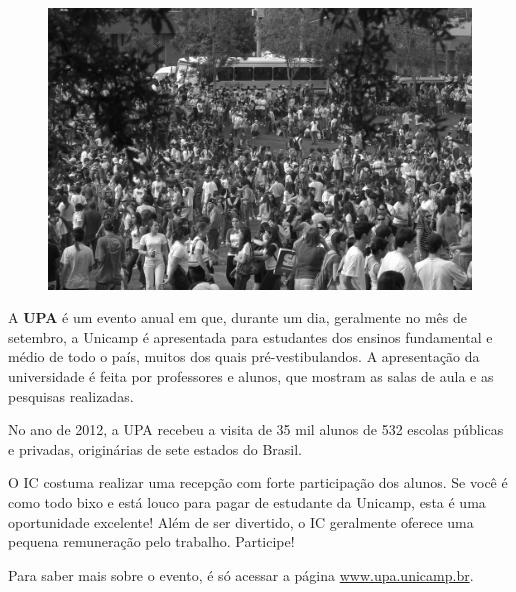 \begin{figure}[h!]
    \centering
    \includegraphics[scale=0.38, keepaspectratio=true]{img/imgs/bateria.jpg}
\end{figure}

A \textbf{UPA} é um evento anual em que, durante um dia, geralmente no mês
de setembro, a Unicamp é apresentada para estudantes dos ensinos fundamental
e médio de todo o país, muitos dos quais pré-vestibulandos. A apresentação
da universidade é feita por professores e alunos, que mostram as salas de aula
e as pesquisas realizadas.

No ano de 2012, a UPA recebeu a visita de 35 mil alunos de 532 escolas públicas
e privadas, originárias de sete estados do Brasil.

O IC costuma realizar uma recepção com forte participação dos alunos. Se você
é como todo bixo e está louco para pagar de estudante da Unicamp, esta é uma
oportunidade excelente! Além de ser divertido, o IC geralmente oferece uma
pequena remuneração pelo trabalho. Participe!

Para saber mais sobre o evento, é só acessar a página \url{www.upa.unicamp.br}.